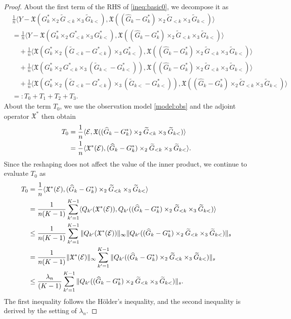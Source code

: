 \begin{proof}
About the first term of the RHS of \eqref{ineq:basic0}, we decompose it as
\begin{align*}
	&\frac{1}{n} \langle Y - \mathfrak{X}(G_k^* \times_2 \tilde{G}_{<k} \times_3 \tilde{G}_{k<}), \mathfrak{X}((\hat{G}_k - G_k^*) \times_2 \tilde{G}_{<k} \times_3 \tilde{G}_{k<}) \rangle \\
	&= \frac{1}{n} \langle Y - \mathfrak{X}(G_k^* \times_2 G_{<k}^* \times_3 G_{k<}^*), \mathfrak{X}((\hat{G}_k - G_k^*) \times_2 \tilde{G}_{<k} \times_3 \tilde{G}_{k<}) \rangle \\
	&\quad  + \frac{1}{n} \langle  \mathfrak{X}(G_k^* \times_2 (\tilde{G}_{<k} - G_{<k}^*)\times_3 G_{k<}^*), \mathfrak{X}((\hat{G}_k - G_k^*) \times_2 \tilde{G}_{<k} \times_3 \tilde{G}_{k<}) \rangle \\
	&\quad  + \frac{1}{n} \langle  \mathfrak{X}(G_k^* \times_2 G_{<k}^*\times_3 (\tilde{G}_{k<} - G_{k<}^*)), \mathfrak{X}((\hat{G}_k - G_k^*) \times_2 \tilde{G}_{<k} \times_3 \tilde{G}_{k<}) \rangle \\
	&\quad  + \frac{1}{n} \langle  \mathfrak{X}(G_k^* \times_2 (\tilde{G}_{<k} - G_{<k}^*)\times_3 (\tilde{G}_{k<} - G_{k<}^*)), \mathfrak{X}((\hat{G}_k - G_k^*) \times_2 \tilde{G}_{<k} \times_3 \tilde{G}_{k<}) \rangle \\
	&=: T_0 + T_1 + T_2 + T_3.
\end{align*}
About the term $T_0$, we use the observation model \eqref{model:obs} and the adjoint operator $\mathfrak{X}^*$ then obtain
\begin{align*}
	T_0 &= \frac{1}{n} \langle \mathcal{E}, \mathfrak{X}((\widehat{G}_k - G_k^*) \times_2 \widetilde{G}_{<k} \times_3 \widetilde{G}_{k<} )\rangle \\
	&= \frac{1}{n} \langle  \mathfrak{X}^*(\mathcal{E}), (\widehat{G}_k - G_k^*) \times_2 \widetilde{G}_{<k} \times_3 \widetilde{G}_{k<} \rangle.
\end{align*}
Since the reshaping does not affect the value of the inner product, we continue to evaluate $T_0$ as
\begin{align*}
	T_0 &=\frac{1}{n} \langle  \mathfrak{X}^*(\mathcal{E}), (\widehat{G}_k - G_k^*) \times_2 \widetilde{G}_{<k} \times_3 \widetilde{G}_{k<} \rangle \\
	& =\frac{1}{n(K-1)} \sum_{k'=1}^{K-1} \langle Q_{k'}(\mathfrak{X}^*(\mathcal{E})), Q_{k'} ( (\widehat{G}_k - G_k^*) \times_2 \widetilde{G}_{<k} \times_3 \widetilde{G}_{k<}) \rangle \\
	& \leq \frac{1}{n(K-1)} \sum_{k'=1}^{K-1} \|Q_{k'}(\mathfrak{X}^*(\mathcal{E}))\|_{\infty} \| Q_{k'} ( (\widehat{G}_k - G_k^*) \times_2 \widetilde{G}_{<k} \times_3 \widetilde{G}_{k<})\|_{s} \\
	&= \frac{1}{n(K-1)}\|\mathfrak{X}^*(\mathcal{E})\|_{\infty} \sum_{k'=1}^{K-1}  \| Q_{k'} ( (\widehat{G}_k - G_k^*) \times_2 \widetilde{G}_{<k} \times_3 \widetilde{G}_{k<})\|_{s} \\
	& \leq \frac{\lambda_n}{(K-1)} \sum_{k'=1}^{K-1}  \| Q_{k'} ( (\widehat{G}_k - G_k^*) \times_2 \widetilde{G}_{<k} \times_3 \widetilde{G}_{k<})\|_{s}.
\end{align*}
The first inequality follows the H\"older's inequality, and the second inequality is derived by the setting of $\lambda_n$.


\end{proof}
